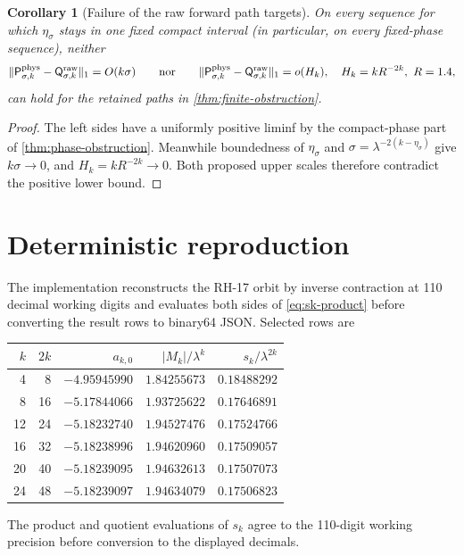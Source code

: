 \documentclass[11pt]{article}
\newtheorem{corollary}[theorem]{Corollary}
\theoremstyle{definition}
\theoremstyle{remark}
\newcommand{\Pb}{\mathsf P}
\newcommand{\Qa}{\mathsf Q}
\begin{document}
\begin{corollary}[Failure of the raw forward path targets]
\label{cor:rate-failure}
On every sequence for which $\eta_\sigma$ stays in one fixed compact
interval (in particular, on every fixed-phase sequence), neither
\begin{equation}\label{eq:false-rates}
 \|\Pb^{\rm phys}_{\sigma,k}-\Qa^{\rm raw}_{\sigma,k}\|_1
 =O(k\sigma)
 \qquad\text{nor}\qquad
 \|\Pb^{\rm phys}_{\sigma,k}-\Qa^{\rm raw}_{\sigma,k}\|_1
 =o(H_k),
 \quad H_k=kR^{-2k},\ R=1.4,
\end{equation}
can hold for the retained paths in
\cref{thm:finite-obstruction}.
\end{corollary}

\begin{proof}
The left sides have a uniformly positive liminf by the compact-phase part of
\cref{thm:phase-obstruction}.  Meanwhile boundedness of $\eta_\sigma$ and
$\sigma=\lambda^{-2(k-\eta_\sigma)}$ give $k\sigma\to0$, and
$H_k=kR^{-2k}\to0$.  Both proposed upper scales therefore contradict the
positive lower bound.
\end{proof}

\section{Deterministic reproduction}

The implementation reconstructs the RH-17 orbit by inverse contraction at
110 decimal working digits and evaluates both sides of
\eqref{eq:sk-product} before converting the result rows to binary64 JSON.
Selected rows are
\begin{center}\small
\begin{tabular}{rrrrr}
\toprule
$k$ & $2k$ & $a_{k,0}$ & $|M_k|/\lambda^k$
& $s_k/\lambda^{2k}$\\
\midrule
4  & 8  & $-4.95945990$ & $1.84255673$ & $0.18488292$\\
8  & 16 & $-5.17844066$ & $1.93725622$ & $0.17646891$\\
12 & 24 & $-5.18232740$ & $1.94527476$ & $0.17524766$\\
16 & 32 & $-5.18238996$ & $1.94620960$ & $0.17509057$\\
20 & 40 & $-5.18239095$ & $1.94632613$ & $0.17507073$\\
24 & 48 & $-5.18239097$ & $1.94634079$ & $0.17506823$\\
\bottomrule
\end{tabular}
\end{center}
The product and quotient evaluations of $s_k$ agree to the 110-digit working
precision before conversion to the displayed decimals.
\end{document}
